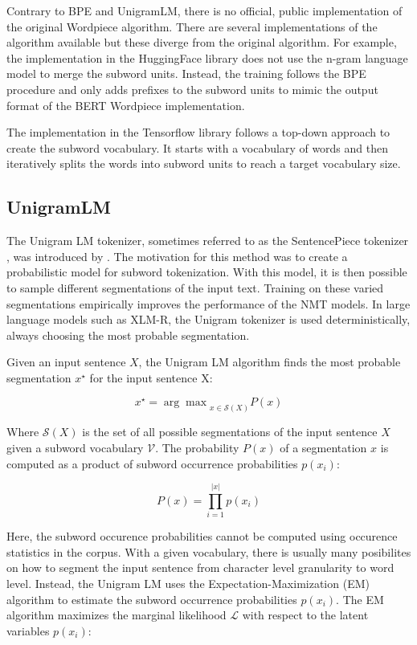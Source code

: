 Contrary to BPE and UnigramLM, there is no official, public implementation of the original Wordpiece algorithm. There are several implementations of the algorithm available but these diverge from the original algorithm. For example, the implementation in the HuggingFace library \citep{Wolf2019} does not use the n-gram language model to merge the subword units. Instead, the training follows the BPE procedure and only adds prefixes to the subword units to mimic the output format of the BERT Wordpiece implementation.

The implementation in the Tensorflow library follows a top-down approach to create the subword vocabulary. It starts with a vocabulary of words and then iteratively splits the words into subword units to reach a target vocabulary size.

\subsection{UnigramLM}

The Unigram LM tokenizer, sometimes referred to as the SentencePiece tokenizer \citep{KudoandRichardson2018}, was introduced by \citet{Kudo2018}. The motivation for this method was to create a probabilistic model for subword tokenization. With this model, it is then possible to sample different segmentations of the input text. Training on these varied segmentations empirically improves the performance of the NMT models. In large language models such as XLM-R, the Unigram tokenizer is used deterministically, always choosing the most probable segmentation.

Given an input sentence $X$, the Unigram LM algorithm finds the most probable segmentation $x^\star$ for the input sentence X:

\begin{equation}
    x^\star = {\arg\max}_{x \in \mathcal{S}(X)} P(x)
\end{equation}


Where $\mathcal{S}(X)$ is the set of all possible segmentations of the input sentence $X$ given a subword vocabulary $\mathcal{V}$. The probability $P(x)$ of a segmentation $x$ is computed as a product of subword occurrence probabilities $p(x_i)$:

\begin{equation}
    P(x) = \prod_{i=1}^{|x|} p(x_i)
\end{equation}

Here, the subword occurence probabilities cannot be computed using occurence statistics in the corpus. With a given vocabulary, there is usually many posibilites on how to segment the input sentence from character level granularity to word level. Instead, the Unigram LM uses the Expectation-Maximization (EM) algorithm to estimate the subword occurrence probabilities $p(x_i)$. The EM algorithm maximizes the marginal likelihood $\mathcal{L}$ with respect to the latent variables $p(x_i)$:


